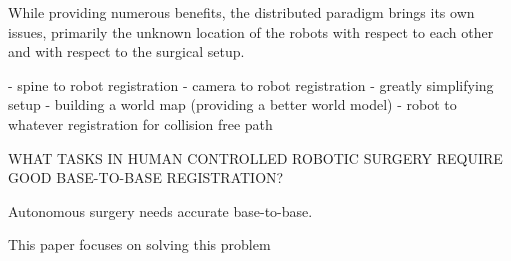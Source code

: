 



While providing numerous benefits, the distributed paradigm brings its own issues, primarily the unknown location of the robots with respect to each other and with respect to the surgical setup. 

- spine to robot registration
- camera to robot registration
- greatly simplifying setup
- building a world map (providing a better world model)
- robot to whatever registration for collision free path

WHAT TASKS IN HUMAN CONTROLLED ROBOTIC SURGERY REQUIRE GOOD BASE-TO-BASE REGISTRATION?

Autonomous surgery needs accurate base-to-base.

This paper focuses on solving this problem


\cite{optas} %

\cite{point_cloud_based_robot_cell_calib}
\cite{hand_eye_calibration_robotic_assisted}


